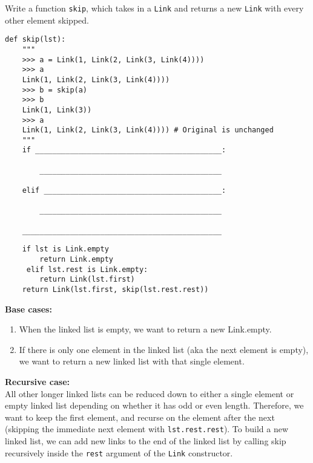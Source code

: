 \begin{blocksection}
\question Write a function \texttt{skip}, which takes in a \texttt{Link} and returns a new \texttt{Link} with every other element skipped.

\begin{lstlisting}
def skip(lst):
    """
    >>> a = Link(1, Link(2, Link(3, Link(4))))
    >>> a
    Link(1, Link(2, Link(3, Link(4))))
    >>> b = skip(a)
    >>> b
    Link(1, Link(3))
    >>> a
    Link(1, Link(2, Link(3, Link(4)))) # Original is unchanged
    """
    if ___________________________________________:
		
        __________________________________________
				
    elif _________________________________________:
		
        __________________________________________
				
    ______________________________________________
\end{lstlisting}
\begin{solution}[0.6in]
\begin{lstlisting}
    if lst is Link.empty 
    	return Link.empty
     elif lst.rest is Link.empty:
        return Link(lst.first)
    return Link(lst.first, skip(lst.rest.rest))
\end{lstlisting}
\textbf{Base cases:}
\begin{enumerate}
\item When the linked list is empty, we want to return a new Link.empty.
\item If there is only one element in the linked list (aka the next element is empty), we want to return a new linked list with that single element. 
\end{enumerate}
\textbf{Recursive case:} \\
All other longer linked lists can be reduced down to either a single element or empty linked list depending on whether it has odd or even length. Therefore, we want to keep the first element, and recurse on the element after the next (skipping the immediate next element with \lstinline{lst.rest.rest}). To build a new linked list, we can add new links to the end of the linked list by calling skip recursively inside the \lstinline{rest} argument of the \lstinline{Link} constructor. 

\end{solution}
\end{blocksection}
